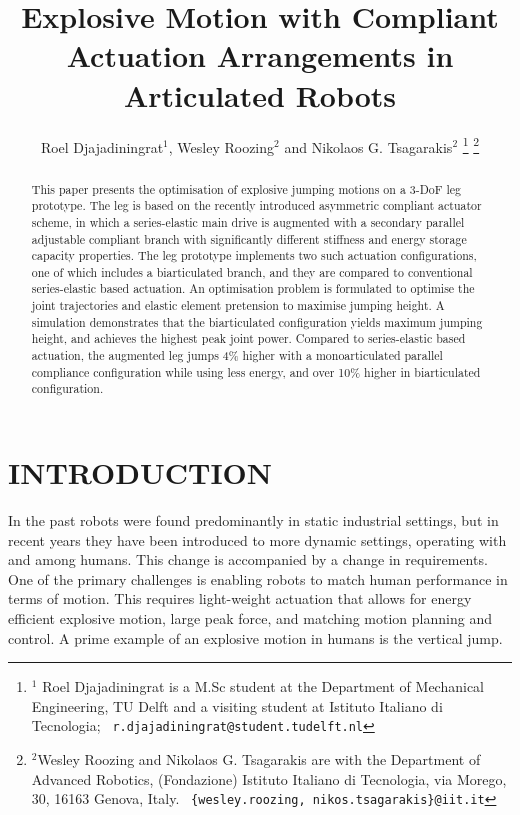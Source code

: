 \documentclass[letterpaper, 10 pt, conference]{ieeeconf}  %
\title{\LARGE \bf
	Explosive Motion with Compliant Actuation Arrangements in Articulated Robots
}
\author{Roel Djajadiningrat$^{1}$, Wesley Roozing$^{2}$ and Nikolaos G. Tsagarakis$^{2}$%
	\thanks{$^{1}$ Roel Djajadiningrat is a M.Sc student at the Department of Mechanical Engineering, TU Delft and a visiting student at Istituto Italiano di Tecnologia;
		{\tt\ r.djajadiningrat@student.tudelft.nl}
	}%
	\thanks{$^{2}$Wesley Roozing and Nikolaos G. Tsagarakis are with the Department of Advanced Robotics,
		(Fondazione) Istituto Italiano di Tecnologia, via Morego,
		30, 16163 Genova, Italy.
		{\tt\ \{wesley.roozing, nikos.tsagarakis\}@iit.it}
	}%
}
\begin{document}
\maketitle
\thispagestyle{empty}
\pagestyle{empty}


\begin{abstract}

This paper presents the optimisation of explosive jumping motions on a 3-DoF leg prototype. The leg is based on the recently introduced asymmetric compliant actuator scheme, in which a series-elastic main drive is augmented with a secondary parallel adjustable compliant branch with significantly different stiffness and energy storage capacity properties. The leg prototype implements two such actuation configurations, one of which includes a biarticulated branch, and they are compared to conventional series-elastic based actuation. An optimisation problem is formulated to optimise the joint trajectories and elastic element pretension to maximise jumping height. A simulation demonstrates that the biarticulated configuration yields maximum jumping height, and achieves the highest peak joint power. Compared to series-elastic based actuation, the augmented leg jumps 4\% higher with a monoarticulated parallel compliance configuration while using less energy, and over 10\% higher in biarticulated configuration.

\end{abstract}


\section{INTRODUCTION}
In the past robots were found predominantly in static industrial settings, but in recent years they have been introduced to more dynamic settings, operating with and among humans. This change is accompanied by a change in requirements. One of the primary challenges is enabling robots to match human performance in terms of motion. This requires light-weight actuation that allows for energy efficient explosive motion, large peak force, and matching motion planning and control. A prime example of an explosive motion in humans is the vertical jump.
\end{document}
